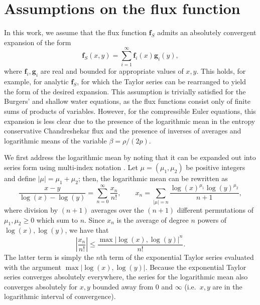 \documentclass[preprint,10pt]{elsarticle}
\theoremstyle{definition}
\theoremstyle{lemma}
\theoremstyle{theorem}
\theoremstyle{assumption}
\newcommand{\LRb}[1]{\left| #1 \right|}
\newcommand{\note}[1]{{\color{blue}{#1}}}
\begin{document}
\appendix
\section{Assumptions on the flux function}
\label{appendix:A}

In this work, we assume that the flux function $\bm{f}_S$ admits an absolutely convergent expansion of the form
\[
\bm{f}_S(x,y) = \sum_{i=1}^{\infty} \bm{f}_i(x) \bm{g}_i(y), 
\]
where $\bm{f}_i, \bm{g}_i$ are real and bounded for appropriate values of $x,y$.  This holds, for example, for analytic $\bm{f}_S$, for which the Taylor series can be rearranged to yield the form of the desired expansion.  This assumption is trivially satisfied for the Burgers' and shallow water equations, as the flux functions consist only of finite sums of products of variables.  However, for the compressible Euler equations, this expansion is less clear due to the presence of the logarithmic mean in the entropy conservative Chandreshekar flux and the presence of inverses of averages and logarithmic means of the variable $\beta = \rho/(2p)$.  


We first address the logarithmic mean by noting that it can be expanded out into series form using multi-index notation \cite{mustonen2002logarithmic}.  Let $\mu= (\mu_1,\mu_2)$ be positive integers and define $\LRb{\mu} = \mu_1 + \mu_2$; then, the logarithmic mean can be rewritten as
\[
\frac{x - y}{\log(x)-\log(y)} = \sum_{n=0}^{\infty} \frac{x_n}{n!}, \qquad x_n = \sum_{\LRb{\mu} = n} \frac{\log(x)^{\mu_1}\log(y)^{\mu_2}}{n+1},
\]
where division by $(n+1)$ averages over the $(n+1)$ different permutations of $\mu_1,\mu_2 \geq 0$ which sum to $n$.  
Since $x_n$ is the average of degree $n$ powers of $\log(x),\log(y)$, we have that
\[
\LRb{\frac{x_n}{n!}} \leq \frac{\max{\LRb{\log(x),\log(y)}}^n}{n!}. 
\]
The latter term is simply the $n$th term of the exponential Taylor series evaluated with the argument $\max{\LRb{\log(x),\log(y)}}$.  Because the exponential Taylor series converges absolutely everywhere, the series for the logarithmic mean also converges absolutely for $x,y$ bounded away from $0$ and $\infty$ (i.e.\ $x,y$ are in the logarithmic interval of convergence).  
\end{document}
